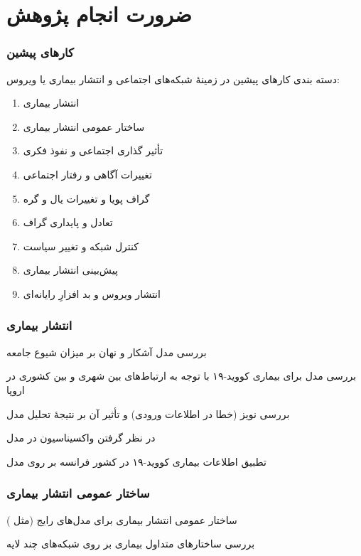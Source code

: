 \documentclass[xcolor=dvipsnames, professionalfonts, aspectratio=169, 11pt]{beamer}
\begin{document}
\section{ضرورت انجام پژوهش}
\begin{frame}
    \frametitle{کارهای پیشین}

    دسته بندی کارهای پیشین در زمینهٔ شبکه‌های اجتماعی و انتشار بیماری  یا ویروس:
    {
    \begin{enumerate}\RTList
        \item<1-2> انتشار بیماری
        \item ساختار عمومی انتشار بیماری
        \item تأثیر گذاری اجتماعی و نفوذ فکری
        \item تغییرات آگاهی و رفتار اجتماعی
        \item<1> گراف پویا و تغییرات یال و گره
        \item<1> تعادل و پایداری گراف
        \item<1> کنترل شبکه و تغییر سیاست
        \item<1> پیش‌بینی انتشار بیماری
        \item<1> انتشار ویروس و بد افزارِ رایانه‌ای

    \end{enumerate}
    }
\end{frame}

\begin{frame}
    \frametitle{انتشار بیماری}

    \begin{moredi}
        \item بررسی مدل آشکار و نهان بر میزان شیوع جامعه \cite{chen2020time}
        \item بررسی مدل  برای بیماری کووید-۱۹ با توجه به ارتباط‌های بین شهری و بین کشوری در اروپا \cite{wang2019coevolution,estrada2020covid}
        \item بررسی نویز (خطا در اطلاعات ورودی) و تأثیر آن بر نتیجهٔ تحلیل مدل  \cite{vizuete2020graphon}
        \item در نظر گرفتن واکسیناسیون در مدل  \cite{khanjanianpak2020competition}
        \item تطبیق اطلاعات بیماری کووید-۱۹ در کشور فرانسه بر روی مدل  \cite{efimov2020interval}
    \end{moredi}

\end{frame}

\begin{frame}
    \frametitle{ساختار عمومی انتشار بیماری}

    \begin{moredi}
        \item ساختار عمومی انتشار بیماری برای مدل‌های رایج (مثل ) \cite{moon2020group}
        \item بررسی ساختارهای متداول بیماری بر روی شبکه‌های چند لایه \cite{abhishek2020sis}
    \end{moredi}

\end{frame}
\end{document}
